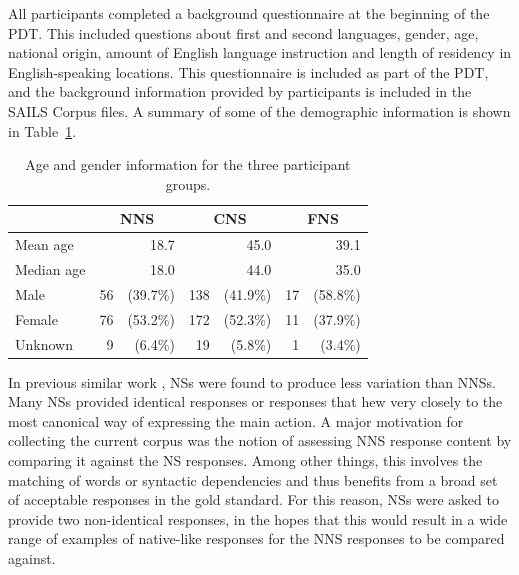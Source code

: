 All participants completed a background questionnaire at the beginning of the PDT. This included questions about first and second languages, gender, age, national origin, amount of English language instruction and length of residency in English-speaking locations. This questionnaire is included as part of the PDT, and the background information provided by participants is included in the SAILS Corpus files. A summary of some of the demographic information is shown in Table~\ref{tab:demographics}.

\begin{table}[htb!]
\begin{center}
\begin{tabular}{|l|rr|rr|rr|}
\hline
& \multicolumn{2}{|c|}{NNS} & \multicolumn{2}{|c|}{CNS} & \multicolumn{2}{|c|}{FNS} \\
\hline
\hline
Mean age & \multicolumn{2}{|r|}{18.7} & \multicolumn{2}{|r|}{45.0} & \multicolumn{2}{|r|}{39.1} \\
\hline
Median age & \multicolumn{2}{|r|}{18.0} & \multicolumn{2}{|r|}{44.0} & \multicolumn{2}{|r|}{35.0} \\
\hline
\hline
Male & 56 & (39.7\%) & 138 & (41.9\%) & 17 & (58.8\%) \\
\hline
Female & 76 & (53.2\%) & 172 & (52.3\%) & 11 & (37.9\%) \\
\hline
Unknown & 9 & (6.4\%) & 19 & (5.8\%) & 1 & (3.4\%) \\
\hline
\end{tabular}
\caption{\label{tab:demographics} Age and gender information for the three participant groups.}
\end{center}
\end{table}


In previous similar work \citep{king:dickinson:13},
NSs were found to produce less variation than NNSs. Many NSs provided identical responses or responses that hew very closely to the most canonical way of expressing the main action. A major motivation for collecting the current corpus was the notion of assessing NNS response content by comparing it against the NS responses. Among other things, this involves the matching of words or syntactic dependencies and thus benefits from a broad set of acceptable responses in the gold standard. For this reason, NSs were asked to provide two non-identical responses, in the hopes that this would result in a wide range of examples of native-like responses for the NNS responses to be compared against.

